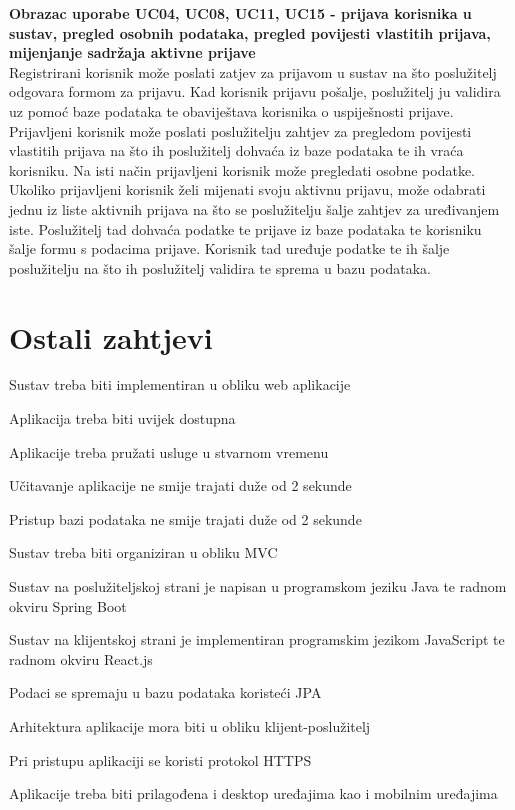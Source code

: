 				\textbf{Obrazac uporabe UC04, UC08, UC11, UC15 - prijava korisnika u sustav, pregled osobnih podataka, pregled povijesti vlastitih prijava, mijenjanje sadržaja aktivne prijave}\\
				Registrirani korisnik može poslati zatjev za prijavom u sustav na što poslužitelj odgovara formom za prijavu. Kad korisnik prijavu pošalje, poslužitelj ju validira uz pomoć baze podataka te obaviještava korisnika o uspiješnosti prijave. Prijavljeni korisnik može poslati poslužitelju zahtjev za pregledom povijesti vlastitih prijava na što ih poslužitelj dohvaća iz baze podataka te ih vraća korisniku. Na isti način prijavljeni korisnik može pregledati osobne podatke.
				Ukoliko prijavljeni korisnik želi mijenati svoju aktivnu prijavu, može odabrati jednu iz liste aktivnih prijava na što se poslužitelju šalje zahtjev za uređivanjem iste. Poslužitelj tad dohvaća podatke te prijave iz baze podataka te korisniku šalje formu s podacima prijave. Korisnik tad uređuje podatke te ih šalje poslužitelju na što ih poslužitelj validira te sprema u bazu podataka.

				\eject
	
		\section{Ostali zahtjevi}
		
			\begin{packed_item}
			\item Sustav treba biti implementiran u obliku web aplikacije
			\item Aplikacija treba biti uvijek dostupna
			\item Aplikacije treba pružati usluge u stvarnom vremenu
			\item Učitavanje aplikacije ne smije trajati duže od 2 sekunde
			\item Pristup bazi podataka ne smije trajati duže od 2 sekunde
			\item Sustav treba biti organiziran u obliku MVC
			\item Sustav na poslužiteljskoj strani je napisan u programskom jeziku Java te radnom okviru Spring Boot
			\item Sustav na klijentskoj strani je implementiran programskim jezikom JavaScript te radnom okviru React.js
			\item Podaci se spremaju u bazu podataka koristeći JPA
			\item Arhitektura aplikacije mora biti u obliku klijent-poslužitelj
			\item Pri pristupu aplikaciji se koristi protokol HTTPS
			\item Aplikacije treba biti prilagođena i desktop uređajima kao i mobilnim uređajima
			\end{packed_item}
			 
